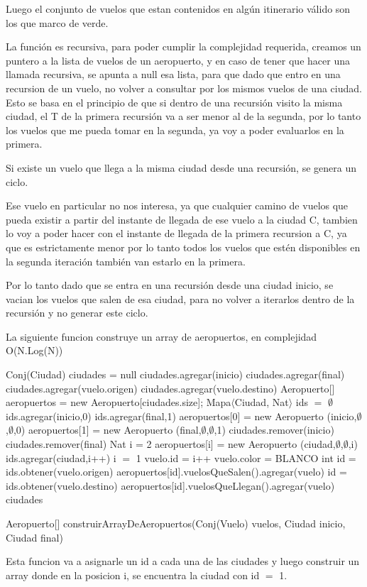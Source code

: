 Luego el conjunto de vuelos que estan contenidos en alg\'un itinerario v\'alido son los que marco de verde.

La funci\'on es recursiva, para poder cumplir la complejidad requerida, creamos un puntero a la lista de vuelos de un aeropuerto, y en caso de tener que hacer una llamada recursiva, se apunta a null esa lista, para que dado que entro en una recursion de un vuelo, no volver a consultar por los mismos vuelos de una ciudad. Esto se basa en el principio de que si dentro de una recursi\'on visito la misma ciudad, el T de la primera recursi\'on va a ser menor al de la segunda, por lo tanto los vuelos que me pueda tomar en la segunda, ya voy a poder evaluarlos en la primera.

Si existe un vuelo que llega a la misma ciudad desde una recursi\'on, se genera un ciclo.

Ese vuelo en particular no nos interesa, ya que cualquier camino de vuelos que pueda existir a partir del instante de llegada de ese vuelo a la ciudad C, tambien lo voy a poder hacer con el instante de llegada de la primera recursion a C, ya que es estrictamente menor por lo tanto todos los vuelos que est\'en disponibles en la segunda iteraci\'on tambi\'en van estarlo en la primera. 

Por lo tanto dado que se entra en una recursi\'on desde una ciudad inicio, se vacian los vuelos que salen de esa ciudad, para no volver a iterarlos dentro de la recursi\'on y no generar este ciclo.

\newpage

La siguiente funcion construye un array de aeropuertos, en complejidad O(N.Log(N))

\begin{algorithm}[H]
\begin{algorithmic}[1]
\STATE Conj(Ciudad) ciudades = null
\STATE ciudades.agregar(inicio)
\STATE ciudades.agregar(final)
	\STATE ciudades.agregar(vuelo.origen)
	\STATE ciudades.agregar(vuelo.destino)
\ENDFOR
\STATE Aeropuerto[] aeropuertos = new Aeropuerto[ciudades.size];
\STATE Mapa$\langle$Ciudad, Nat$\rangle$ ids $=$ $\emptyset$
\STATE ids.agregar(inicio,0)
\STATE ids.agregar(final,1)
\STATE aeropuertos[0] = new Aeropuerto (inicio,$\emptyset$,$\emptyset$,0)
\STATE aeropuertos[1] = new Aeropuerto (final,$\emptyset$,$\emptyset$,1)
\STATE ciudades.remover(inicio)
\STATE ciudades.remover(final)
\STATE Nat i = 2
	\STATE aeropuertos[i] = new Aeropuerto (ciudad,$\emptyset$,$\emptyset$,i)
	\STATE ids.agregar(ciudad,i++)
\ENDFOR
\STATE i $=$ 1
	\STATE vuelo.id = i++	
	\STATE vuelo.color = BLANCO	
	\STATE int id = ids.obtener(vuelo.origen)
	\STATE aeropuertos[id].vuelosQueSalen().agregar(vuelo)
	\STATE id = ids.obtener(vuelo.destino)
	\STATE aeropuertos[id].vuelosQueLlegan().agregar(vuelo)
\ENDFOR
\RETURN ciudades
\caption{Aeropuerto[] construirArrayDeAeropuertos(Conj(Vuelo) vuelos, Ciudad inicio, Ciudad final)}%
\end{algorithmic}
\end{algorithm}
Esta funcion va a asignarle un id a cada una de las ciudades y luego construir un array donde en la posicion i, se encuentra la ciudad con id $=$ 1.

